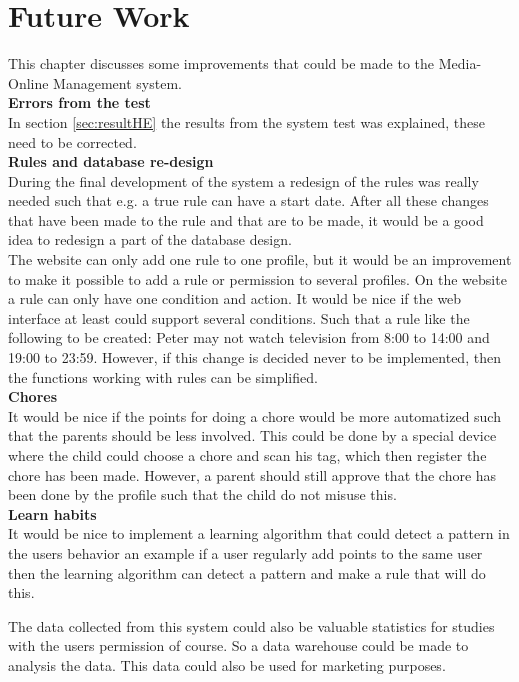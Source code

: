 \chapter{Future Work}
This chapter discusses some improvements that could be made to the Media-Online Management system.\\

\textbf{Errors from the test}\\
In section \vref{sec:resultHE} the results from the system test was explained, these need to be corrected.\\
 
\textbf{Rules and database re-design}\\
During the final development of the system a redesign of the rules was really needed such that e.g. a true rule can have a start date. After all these changes that have been made to the rule and that are to be made, it would be a good idea to redesign a part of the database design. \\

The website can only add one rule to one profile, but it would be an improvement to make it possible to add a rule or permission to several profiles. On the website a rule can only have one condition and action. It would be nice if the web interface at least could support several conditions. Such that a rule like the following to be created: Peter may not watch television from 8:00 to 14:00 and 19:00 to 23:59. However, if this change is decided never to be implemented, then the functions working with rules can be simplified. \\

\textbf{Chores}\\
It would be nice if the points for doing a chore would be more automatized such that the parents should be less involved. This could be done by a special device where the child could choose a chore and scan his tag, which then register the chore has been made. However, a parent should still approve that the chore has been done by the profile such that the child do not misuse this.\\

\textbf{Learn habits}\\
It would be nice to implement a learning algorithm that could detect a pattern in the users behavior an example if a user regularly add points to the same user then the learning algorithm can detect a pattern and make a rule that will do this. 

The data collected from this system could also be valuable statistics for studies with the users permission of course. So a data warehouse could be made to analysis the data. This data could also be used for marketing purposes. \\

